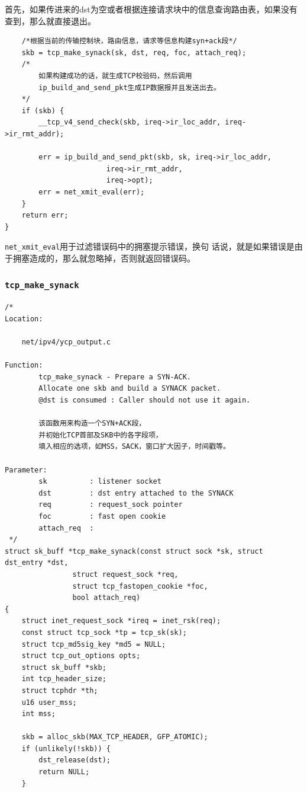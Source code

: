     首先，如果传进来的dst为空或者根据连接请求块中的信息查询路由表，如果没有查到，那么就直接退出。       

\begin{verbatim}
    /*根据当前的传输控制块，路由信息，请求等信息构建syn+ack段*/
    skb = tcp_make_synack(sk, dst, req, foc, attach_req);
    /*
        如果构建成功的话，就生成TCP校验码，然后调用
        ip_build_and_send_pkt生成IP数据报并且发送出去。
    */
    if (skb) {
        __tcp_v4_send_check(skb, ireq->ir_loc_addr, ireq->ir_rmt_addr);

        err = ip_build_and_send_pkt(skb, sk, ireq->ir_loc_addr,
                        ireq->ir_rmt_addr,
                        ireq->opt);
        err = net_xmit_eval(err);
    }
    return err;
}
\end{verbatim}
                \texttt{net_xmit_eval}用于过滤错误码中的拥塞提示错误，换句
话说，就是如果错误是由于拥塞造成的，那么就忽略掉，否则就返回错误码。
            \subsubsection{\texttt{tcp_make_synack}}
                \label{ServerSendSYN+ACK:tcp_make_synack}

\begin{verbatim}
/*
Location:

    net/ipv4/ycp_output.c

Function:
        tcp_make_synack - Prepare a SYN-ACK.
        Allocate one skb and build a SYNACK packet.
        @dst is consumed : Caller should not use it again.

        该函数用来构造一个SYN+ACK段，
        并初始化TCP首部及SKB中的各字段项，
        填入相应的选项，如MSS，SACK，窗口扩大因子，时间戳等。

Parameter:
        sk          : listener socket
        dst         : dst entry attached to the SYNACK
        req         : request_sock pointer
        foc         : fast open cookie
        attach_req  :
 */
struct sk_buff *tcp_make_synack(const struct sock *sk, struct dst_entry *dst,
                struct request_sock *req,
                struct tcp_fastopen_cookie *foc,
                bool attach_req)
{
    struct inet_request_sock *ireq = inet_rsk(req);
    const struct tcp_sock *tp = tcp_sk(sk);
    struct tcp_md5sig_key *md5 = NULL;
    struct tcp_out_options opts;
    struct sk_buff *skb;
    int tcp_header_size;
    struct tcphdr *th;
    u16 user_mss;
    int mss;

    skb = alloc_skb(MAX_TCP_HEADER, GFP_ATOMIC);
    if (unlikely(!skb)) {
        dst_release(dst);
        return NULL;
    }
\end{verbatim}

